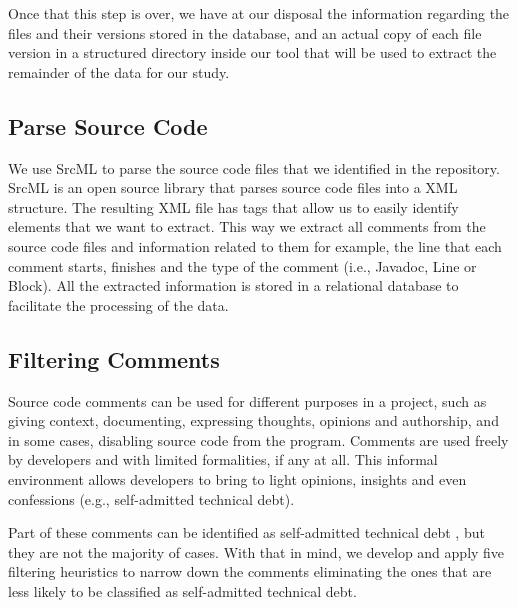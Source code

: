 Once that this step is over, we have at our disposal the information regarding the files and their versions stored in the database, and an actual copy of each file version in a structured directory inside our tool that will be used to extract the remainder of the data for our study.

\subsection*{Parse Source Code}
\label{sub:parse_source_code}

We use SrcML \cite{Collard2013SIE} to parse the source code files that we identified in the repository. SrcML is an open source library that parses source code files into a XML structure. The resulting XML file has tags that allow us to easily identify elements that we want to extract. This way we extract all comments from the source code files and information related to them for example, the line that each comment starts, finishes and the type of the comment (i.e., Javadoc, Line or Block). All the extracted information is stored in a relational database to facilitate the processing of the data. 


\subsection*{Filtering Comments}
\label{sub:filtering_comments}

Source code comments can be used for different purposes in a project, such as giving context, documenting, expressing thoughts, opinions and authorship, and in some cases, disabling source code from the program. Comments are used freely by developers and with limited formalities, if any at all. This informal environment allows developers to bring to light opinions, insights and even confessions (e.g., self-admitted technical debt). 

Part of these comments can be identified as self-admitted technical debt \cite{Potdar2014ICSME},  but they are not the majority of cases. With that in mind, we develop and apply five filtering heuristics  to narrow down the comments eliminating the ones that are less likely to be classified as self-admitted technical debt. 

